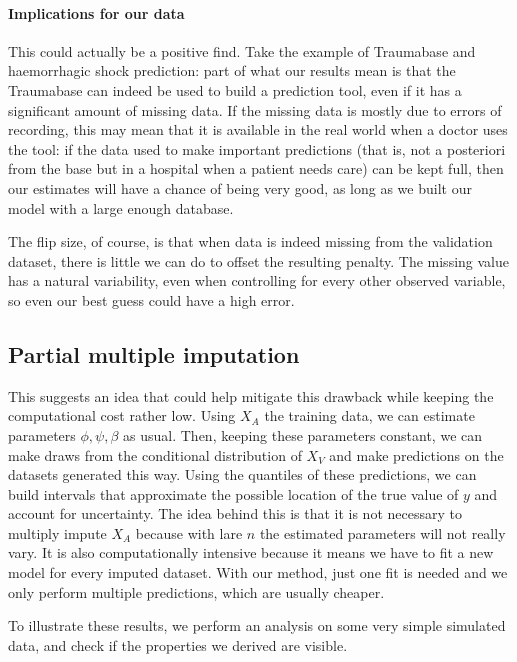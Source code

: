 \paragraph{Implications for our data}

This could actually be a positive find. Take the example of Traumabase and haemorrhagic shock prediction: part of what our results mean is that the Traumabase can indeed be used to build a prediction tool, even if it has a significant amount of missing data. If the missing data is mostly due to errors of recording, this may mean that it is available in the real world when a doctor uses the tool: if the data used to make important predictions (that is, not a posteriori from the base but in a hospital when a patient needs care) can be kept full, then our estimates will have a chance of being very good, as long as we built our model with a large enough database.

The flip size, of course, is that when data is indeed missing from the validation dataset, there is little we can do to offset the resulting penalty. The missing value has a natural variability, even when controlling for every other observed variable, so even our best guess could have a high error. 

\subsection{Partial multiple imputation}
This suggests an idea that could help mitigate this drawback while keeping the computational cost rather low. Using $X_A$ the training data, we can estimate parameters $\phi, \psi, \beta$ as usual. Then, keeping these parameters constant, we can make draws from the conditional distribution of $X_V$ and make predictions on the datasets generated this way. Using the quantiles of these predictions, we can build intervals that approximate the possible location of the true value of $y$ and account for uncertainty. The idea behind this is that it is not necessary to multiply impute $X_A$ because with lare $n$ the estimated parameters will not really vary. It is also computationally intensive because it means we have to fit a new model for every imputed dataset. With our method, just one fit is needed and we only perform multiple predictions, which are usually cheaper.

To illustrate these results, we perform an analysis on some very simple simulated data, and check if the properties we derived are visible.

